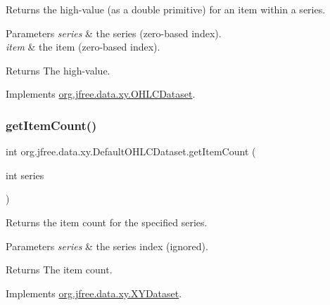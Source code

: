 Returns the high-\/value (as a double primitive) for an item within a series.


\begin{DoxyParams}{Parameters}
{\em series} & the series (zero-\/based index). \\
\hline
{\em item} & the item (zero-\/based index).\\
\hline
\end{DoxyParams}
\begin{DoxyReturn}{Returns}
The high-\/value. 
\end{DoxyReturn}


Implements \mbox{\hyperlink{interfaceorg_1_1jfree_1_1data_1_1xy_1_1_o_h_l_c_dataset_acd02ab8db72bebf0234954bd962365cb}{org.\+jfree.\+data.\+xy.\+O\+H\+L\+C\+Dataset}}.

\mbox{\label{classorg_1_1jfree_1_1data_1_1xy_1_1_default_o_h_l_c_dataset_ac8693287c1a19d1228b14cb9c22f52aa}} 
\subsubsection{\texorpdfstring{get\+Item\+Count()}{getItemCount()}}
{\footnotesize\ttfamily int org.\+jfree.\+data.\+xy.\+Default\+O\+H\+L\+C\+Dataset.\+get\+Item\+Count (\begin{DoxyParamCaption}\item[{int}]{series }\end{DoxyParamCaption})}

Returns the item count for the specified series.


\begin{DoxyParams}{Parameters}
{\em series} & the series index (ignored).\\
\hline
\end{DoxyParams}
\begin{DoxyReturn}{Returns}
The item count. 
\end{DoxyReturn}


Implements \mbox{\hyperlink{interfaceorg_1_1jfree_1_1data_1_1xy_1_1_x_y_dataset_ae81f9de91dfcae45028fc8a486a119da}{org.\+jfree.\+data.\+xy.\+X\+Y\+Dataset}}.

